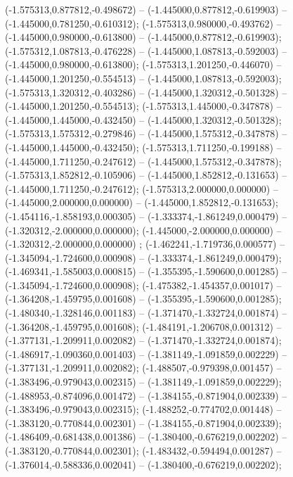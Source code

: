  (-1.575313,0.877812,-0.498672) -- (-1.445000,0.877812,-0.619903) -- (-1.445000,0.781250,-0.610312);
 (-1.575313,0.980000,-0.493762) -- (-1.445000,0.980000,-0.613800) -- (-1.445000,0.877812,-0.619903);
 (-1.575312,1.087813,-0.476228) -- (-1.445000,1.087813,-0.592003) -- (-1.445000,0.980000,-0.613800);
 (-1.575313,1.201250,-0.446070) -- (-1.445000,1.201250,-0.554513) -- (-1.445000,1.087813,-0.592003);
 (-1.575313,1.320312,-0.403286) -- (-1.445000,1.320312,-0.501328) -- (-1.445000,1.201250,-0.554513);
 (-1.575313,1.445000,-0.347878) -- (-1.445000,1.445000,-0.432450) -- (-1.445000,1.320312,-0.501328);
 (-1.575313,1.575312,-0.279846) -- (-1.445000,1.575312,-0.347878) -- (-1.445000,1.445000,-0.432450);
 (-1.575313,1.711250,-0.199188) -- (-1.445000,1.711250,-0.247612) -- (-1.445000,1.575312,-0.347878);
 (-1.575313,1.852812,-0.105906) -- (-1.445000,1.852812,-0.131653) -- (-1.445000,1.711250,-0.247612);
 (-1.575313,2.000000,0.000000) -- (-1.445000,2.000000,0.000000) -- (-1.445000,1.852812,-0.131653);
 (-1.454116,-1.858193,0.000305) -- (-1.333374,-1.861249,0.000479) -- (-1.320312,-2.000000,0.000000);
 (-1.445000,-2.000000,0.000000) -- (-1.320312,-2.000000,0.000000) ;
 (-1.462241,-1.719736,0.000577) -- (-1.345094,-1.724600,0.000908) -- (-1.333374,-1.861249,0.000479);
 (-1.469341,-1.585003,0.000815) -- (-1.355395,-1.590600,0.001285) -- (-1.345094,-1.724600,0.000908);
 (-1.475382,-1.454357,0.001017) -- (-1.364208,-1.459795,0.001608) -- (-1.355395,-1.590600,0.001285);
 (-1.480340,-1.328146,0.001183) -- (-1.371470,-1.332724,0.001874) -- (-1.364208,-1.459795,0.001608);
 (-1.484191,-1.206708,0.001312) -- (-1.377131,-1.209911,0.002082) -- (-1.371470,-1.332724,0.001874);
 (-1.486917,-1.090360,0.001403) -- (-1.381149,-1.091859,0.002229) -- (-1.377131,-1.209911,0.002082);
 (-1.488507,-0.979398,0.001457) -- (-1.383496,-0.979043,0.002315) -- (-1.381149,-1.091859,0.002229);
 (-1.488953,-0.874096,0.001472) -- (-1.384155,-0.871904,0.002339) -- (-1.383496,-0.979043,0.002315);
 (-1.488252,-0.774702,0.001448) -- (-1.383120,-0.770844,0.002301) -- (-1.384155,-0.871904,0.002339);
 (-1.486409,-0.681438,0.001386) -- (-1.380400,-0.676219,0.002202) -- (-1.383120,-0.770844,0.002301);
 (-1.483432,-0.594494,0.001287) -- (-1.376014,-0.588336,0.002041) -- (-1.380400,-0.676219,0.002202);
